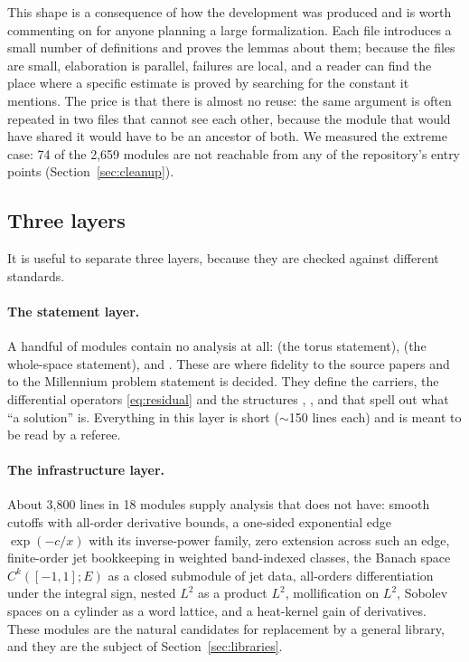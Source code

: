 This shape is a consequence of how the development was produced and is worth commenting
on for anyone planning a large formalization. Each file introduces a small number of
definitions and proves the lemmas about them; because the files are small, elaboration is
parallel, failures are local, and a reader can find the place where a specific estimate is
proved by searching for the constant it mentions. The price is that there is almost no
reuse: the same argument is often repeated in two files that cannot see each other,
because the module that would have shared it would have to be an ancestor of both. We
measured the extreme case: 74 of the 2,659 modules are not reachable from any of the
repository's entry points (Section~\ref{sec:cleanup}).

\subsection{Three layers}
\label{sec:layers}

It is useful to separate three layers, because they are checked against different
standards.

\paragraph{The statement layer.} A handful of modules contain no analysis at all:
 (the torus statement),
 (the whole-space statement),
 and . These are
where fidelity to the source papers and to the Millennium problem statement is decided.
They define the carriers, the differential operators \eqref{eq:residual} and the
structures , ,
 and  that spell out what
``a solution'' is. Everything in this layer is short ($\sim$150 lines each) and is meant to
be read by a referee.

\paragraph{The infrastructure layer.} About 3{,}800 lines in 18 modules supply analysis
that \Mathlib{} does not have: smooth cutoffs with all-order derivative bounds, a
one-sided exponential edge $\exp(-c/x)$ with its inverse-power family, zero extension
across such an edge, finite-order jet bookkeeping in weighted band-indexed classes, the
Banach space $C^k([-1,1];E)$ as a closed submodule of jet data, all-orders differentiation
under the integral sign, nested $L^2$ as a product $L^2$, mollification on $L^2$, Sobolev
spaces on a cylinder as a word lattice, and a heat-kernel gain of derivatives. These
modules are the natural candidates for replacement by a general library, and they are the
subject of Section~\ref{sec:libraries}.

